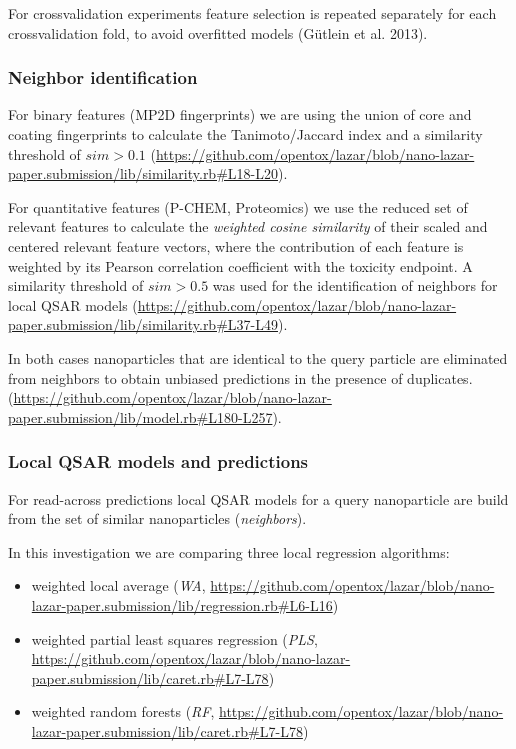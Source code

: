 \documentclass[utf8]{frontiersHLTH} %
\providecommand{\tightlist}{%
  \setlength{\itemsep}{0pt}\setlength{\parskip}{0pt}}
\begin{document}
For crossvalidation experiments feature selection is repeated separately
for each crossvalidation fold, to avoid overfitted models (Gütlein et
al. 2013).

\subsubsection{Neighbor identification}\label{neighbor-identification}

For binary features (MP2D fingerprints) we are using the union of core
and coating fingerprints to calculate the Tanimoto/Jaccard index and a
similarity threshold of \(sim > 0.1\)
(\url{https://github.com/opentox/lazar/blob/nano-lazar-paper.submission/lib/similarity.rb\#L18-L20}).

For quantitative features (P-CHEM, Proteomics) we use the reduced set of
relevant features to calculate the \emph{weighted cosine similarity} of
their scaled and centered relevant feature vectors, where the
contribution of each feature is weighted by its Pearson correlation
coefficient with the toxicity endpoint. A similarity threshold of
\(sim > 0.5\) was used for the identification of neighbors for local
QSAR models
(\url{https://github.com/opentox/lazar/blob/nano-lazar-paper.submission/lib/similarity.rb\#L37-L49}).

In both cases nanoparticles that are identical to the query particle are
eliminated from neighbors to obtain unbiased predictions in the presence
of duplicates.
(\url{https://github.com/opentox/lazar/blob/nano-lazar-paper.submission/lib/model.rb\#L180-L257}).

\subsubsection{Local QSAR models and
predictions}\label{local-qsar-models-and-predictions}

For read-across predictions local QSAR models for a query nanoparticle
are build from the set of similar nanoparticles (\emph{neighbors}).

In this investigation we are comparing three local regression
algorithms:

\begin{itemize}
\tightlist
\item
  weighted local average (\emph{WA},
  \url{https://github.com/opentox/lazar/blob/nano-lazar-paper.submission/lib/regression.rb\#L6-L16})
\item
  weighted partial least squares regression (\emph{PLS},
  \url{https://github.com/opentox/lazar/blob/nano-lazar-paper.submission/lib/caret.rb\#L7-L78})
\item
  weighted random forests (\emph{RF},
  \url{https://github.com/opentox/lazar/blob/nano-lazar-paper.submission/lib/caret.rb\#L7-L78})
\end{itemize}
\end{document}
